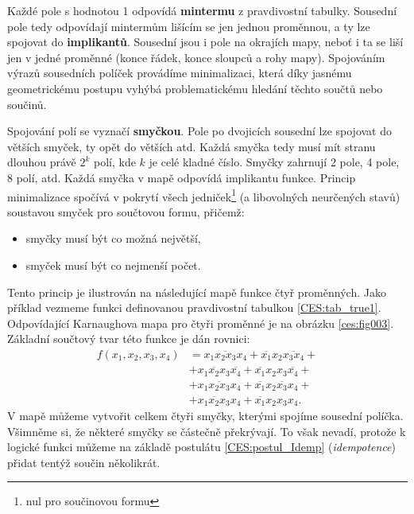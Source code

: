      Každé pole s hodnotou 1 odpovídá \textbf{mintermu} z pravdivostní tabulky. Sousední pole tedy 
     odpovídají mintermům lišícím se jen jednou proměnnou, a ty lze spojovat do 
     \textbf{implikantů}. Sousední jsou i pole na okrajích mapy, neboť i ta se liší
     jen v jedné proměnné (konce řádek, konce sloupců a rohy mapy). Spojováním výrazů sousedních 
     políček provádíme minimalizaci, která díky jasnému geometrickému postupu vyhýbá 
     problematickému hledání těchto součtů nebo součinů. 
     
     Spojování polí se vyznačí \textbf{smyčkou}. Pole po dvojicích sousední lze spojovat do větších 
     smyček, ty opět do větších atd. Každá smyčka tedy musí mít stranu dlouhou právě $2^k$ polí, 
     kde $k$  je celé kladné číslo. Smyčky zahrnují 2 pole, 4 pole, 8 polí, atd. Každá smyčka v 
     mapě odpovídá implikantu funkce. Princip minimalizace spočívá v pokrytí všech     
     jedniček\footnote{nul pro součinovou formu} (a libovolných neurčených stavů) soustavou smyček 
     pro součtovou formu, přičemž:
     \begin{itemize}\addtolength{\itemsep}{-0.5\baselineskip}
       \item smyčky musí být co možná největší,
       \item smyček musí být co nejmenší počet.       
     \end{itemize}     
     Tento princip je ilustrován na následující mapě funkce čtyř proměnných. Jako příklad vezmeme 
     funkci definovanou pravdivostní tabulkou \ref{CES:tab_true1}. Odpovídající Karnaughova mapa 
     pro čtyři proměnné je na obrázku \ref{ces:fig003}. Základní součtový tvar této funkce je 
     dán rovnici:     
     \begin{align}
        f(x_1, x_2, x_3, x_4) 
          &= \overline{x_1x_2x_3x_4} + \overline{x_1}x_2\overline{x_3x_4} +           \nonumber \\
          &+ x_1\overline{x_2}x_3\overline{x_4} + \overline{x_1}x_2x_3\overline{x_4}+ \nonumber \\ 
          &+ x_1\overline{x_2x_3}x_4 + \overline{x_1}x_2\overline{x_3}x_4 +           \nonumber \\ 
          &+ x_1\overline{x_2}x_3x_4 + \overline{x_1}x_2x_3x_4.                          
     \end{align}
     V mapě můžeme vytvořit celkem čtyři smyčky, kterými spojíme sousední políčka. Všimněme si, že 
     některé smyčky se částečně překrývají. To však nevadí, protože k logické funkci můžeme na 
     základě postulátu \ref{CES:postul_Idemp} (\emph{idempotence})
     přidat tentýž součin několikrát. 
     
